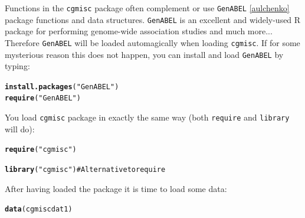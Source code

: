 \documentclass{article}\usepackage{graphicx, color}
\makeatletter
\newcommand{\hlfunctioncall}[1]{\textcolor[rgb]{0.501960784313725,0,0.329411764705882}{\textbf{#1}}}%
\newcommand{\hlstring}[1]{\textcolor[rgb]{0.6,0.6,1}{#1}}%
\newenvironment{kframe}{%
 \def\at@end@of@kframe{}%
 \ifinner\ifhmode%
  \def\at@end@of@kframe{\end{minipage}}%
  \begin{minipage}{\columnwidth}%
 \fi\fi%
 \def\FrameCommand##1{\hskip\@totalleftmargin \hskip-\fboxsep
 \colorbox{shadecolor}{##1}\hskip-\fboxsep
     \hskip-\linewidth \hskip-\@totalleftmargin \hskip\columnwidth}%
 \MakeFramed {\advance\hsize-\width
   \@totalleftmargin\z@ \linewidth\hsize
   \@setminipage}}%
 {\par\unskip\endMakeFramed%
 \at@end@of@kframe}
\newenvironment{knitrout}{}{} %
\makeatother
\begin{document}
\noindent Functions in the {\tt cgmisc} package often complement or use {\tt GenABEL} \ref{aulchenko} package functions and data structures. {\tt GenABEL} is an excellent and widely-used R package for performing genome-wide association studies and much more... Therefore {\tt GenABEL} will be loaded automagically when loading {\tt cgmisc}. If for some mysterious reason this does not happen, you can install and load {\tt GenABEL} by typing:
\begin{knitrout}
\color{fgcolor}\begin{kframe}
\begin{alltt}
\hlfunctioncall{install.packages}(\hlstring{"GenABEL"})
\hlfunctioncall{require}(\hlstring{"GenABEL"})
\end{alltt}
\end{kframe}
\end{knitrout}

\noindent You load {\tt cgmisc} package in exactly the same way (both {\tt require} and {\tt library} will do):
\begin{knitrout}
\color{fgcolor}\begin{kframe}
\begin{alltt}
\hlfunctioncall{require}(\hlstring{"cgmisc"})
\end{alltt}


{\ttfamily\noindent\itshape\color{messagecolor}{\#\# Loading required package: cgmisc}}

{\ttfamily\noindent\itshape\color{messagecolor}{\#\# Loading required package: GenABEL}}

{\ttfamily\noindent\itshape\color{messagecolor}{\#\# Loading required package: MASS}}

{\ttfamily\noindent\itshape\color{messagecolor}{\#\# GenABEL v. 1.7-4 (February 22, 2013) loaded}}\begin{alltt}
\hlfunctioncall{library}(\hlstring{"cgmisc"})  # Alternative to require
\end{alltt}
\end{kframe}
\end{knitrout}

\noindent After having loaded the package it is time to load some data:
\begin{knitrout}
\color{fgcolor}\begin{kframe}
\begin{alltt}
\hlfunctioncall{data}(cgmiscdat1)
\end{alltt}
\end{kframe}
\end{knitrout}
\end{document}
